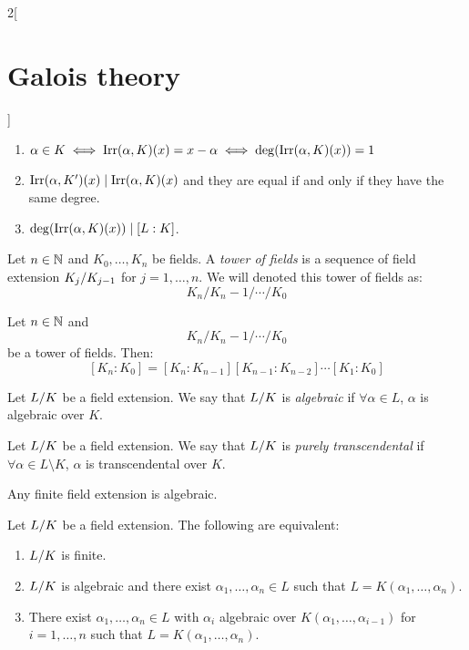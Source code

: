 \documentclass[../../../main.tex]{subfiles}
\begin{document}
\begin{multicols}{2}[\section{Galois theory}]
\begin{prop}
\begin{enumerate}
      \item $\alpha\in K\iff\operatorname{Irr}(\alpha,K)(x)=x-\alpha\iff \deg(\operatorname{Irr}(\alpha,K)(x))=1$
      \item $\operatorname{Irr}(\alpha,K')(x)\mid\operatorname{Irr}(\alpha,K)(x)$ and they are equal if and only if they have the same degree.
      \item $\deg(\operatorname{Irr}(\alpha,K)(x))\mid [L:K]$.
    \end{enumerate}
  \end{prop}
  \begin{definition}
    Let $n\in\mathbb{N}$ and $K_0,\ldots,K_n$ be fields. A \textit{tower of fields} is a sequence of field extension $\quot{K_j}{K_{j-1}}$ for $j=1,\ldots,n$. We will denoted this tower of fields as: $$K_n/K_n-1/\cdots/K_0$$
  \end{definition}
  \begin{corollary}
    Let $n\in\mathbb{N}$ and $$K_n/K_n-1/\cdots/K_0$$ be a tower of fields. Then: $$[K_n:K_0]=[K_n:K_{n-1}][K_{n-1}:K_{n-2}]\cdots[K_1:K_0]$$
  \end{corollary}
  \begin{definition}
    Let $\quot{L}{K}$ be a field extension. We say that $\quot{L}{K}$ is \textit{algebraic} if $\forall\alpha\in L$, $\alpha$ is algebraic over $K$.
  \end{definition}
  \begin{definition}
    Let $\quot{L}{K}$ be a field extension. We say that $\quot{L}{K}$ is \textit{purely transcendental} if $\forall\alpha\in L\setminus K$, $\alpha$ is transcendental over $K$.
  \end{definition}
  \begin{lemma}
    Any finite field extension is algebraic.
  \end{lemma}
  \begin{prop}
    Let $\quot{L}{K}$ be a field extension. The following are equivalent:
    \begin{enumerate}
      \item $\quot{L}{K}$ is finite.
      \item $\quot{L}{K}$ is algebraic and there exist $\alpha_1,\ldots,\alpha_n\in L$ such that $L=K(\alpha_1,\ldots,\alpha_n)$.
      \item There exist $\alpha_1,\ldots,\alpha_n\in L$ with $\alpha_i$ algebraic over $K(\alpha_1,\ldots,\alpha_{i-1})$ for $i=1,\ldots,n$ such that $L=K(\alpha_1,\ldots,\alpha_n)$.
    \end{enumerate}
  \end{prop}
  \begin{prop}

\end{prop}
\end{multicols}
\end{document}
